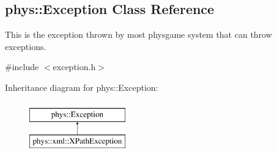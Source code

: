 \hypertarget{classphys_1_1Exception}{
\subsection{phys::Exception Class Reference}
\label{dc/d47/classphys_1_1Exception}
}


This is the exception thrown by most physgame system that can throw exceptions.  




{\ttfamily \#include $<$exception.h$>$}

Inheritance diagram for phys::Exception:\begin{figure}[H]
\begin{center}
\leavevmode
\includegraphics[height=2.000000cm]{dc/d47/classphys_1_1Exception}
\end{center}
\end{figure}
